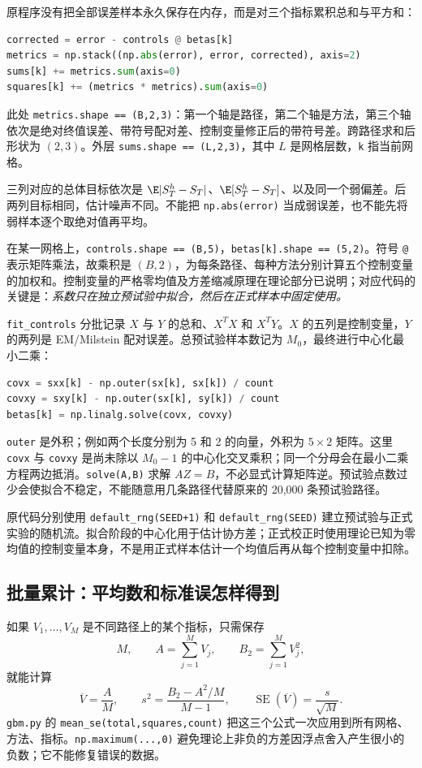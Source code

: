 原程序没有把全部误差样本永久保存在内存，而是对三个指标累积总和与平方和：
\begin{lstlisting}[language=Python]
corrected = error - controls @ betas[k]
metrics = np.stack((np.abs(error), error, corrected), axis=2)
sums[k] += metrics.sum(axis=0)
squares[k] += (metrics * metrics).sum(axis=0)
\end{lstlisting}
此处 \texttt{metrics.shape == (B,2,3)}：第一个轴是路径，第二个轴是方法，第三个轴依次是绝对终值误差、带符号配对差、控制变量修正后的带符号差。跨路径求和后形状为 $(2,3)$。外层 \texttt{sums.shape == (L,2,3)}，其中 $L$ 是网格层数，\texttt{k} 指当前网格。

三列对应的总体目标依次是 $\E|S_T^h-S_T|$、$\E[S_T^h-S_T]$、以及同一个弱偏差。后两列目标相同，估计噪声不同。不能把 \texttt{np.abs(error)} 当成弱误差，也不能先将弱样本逐个取绝对值再平均。

在某一网格上，\texttt{controls.shape == (B,5)}，\texttt{betas[k].shape == (5,2)}。符号 \texttt{@} 表示矩阵乘法，故乘积是 $(B,2)$，为每条路径、每种方法分别计算五个控制变量的加权和。控制变量的严格零均值及方差缩减原理在理论部分已说明；对应代码的关键是：\emph{系数只在独立预试验中拟合，然后在正式样本中固定使用。}

\texttt{fit\_controls} 分批记录 $X$ 与 $Y$ 的总和、$X^TX$ 和 $X^TY$。$X$ 的五列是控制变量，$Y$ 的两列是 EM/Milstein 配对误差。总预试验样本数记为 $M_0$，最终进行中心化最小二乘：
\begin{lstlisting}[language=Python]
covx = sxx[k] - np.outer(sx[k], sx[k]) / count
covxy = sxy[k] - np.outer(sx[k], sy[k]) / count
betas[k] = np.linalg.solve(covx, covxy)
\end{lstlisting}
\texttt{outer} 是外积；例如两个长度分别为 5 和 2 的向量，外积为 $5\times2$ 矩阵。这里 \texttt{covx} 与 \texttt{covxy} 是尚未除以 $M_0-1$ 的中心化交叉乘积；同一个分母会在最小二乘方程两边抵消。\texttt{solve(A,B)} 求解 $AZ=B$，不必显式计算矩阵逆。预试验点数过少会使拟合不稳定，不能随意用几条路径代替原来的 20,000 条预试验路径。

原代码分别使用 \texttt{default\_rng(SEED+1)} 和 \texttt{default\_rng(SEED)} 建立预试验与正式实验的随机流。拟合阶段的中心化用于估计协方差；正式校正时使用理论已知为零均值的控制变量本身，不是用正式样本估计一个均值后再从每个控制变量中扣除。

\subsection{批量累计：平均数和标准误怎样得到}

如果 $V_1,\ldots,V_M$ 是不同路径上的某个指标，只需保存
\[
M,\qquad A=\sum_{j=1}^M V_j,\qquad B_2=\sum_{j=1}^M V_j^2,
\]
就能计算
\begin{equation}
\overline V=\frac{A}{M},\qquad
s^2=\frac{B_2-A^2/M}{M-1},\qquad
\operatorname{SE}(\overline V)=\frac{s}{\sqrt M}.
\label{code:streaming}
\end{equation}
\texttt{gbm.py} 的 \texttt{mean\_se(total,squares,count)} 把这三个公式一次应用到所有网格、方法、指标。\texttt{np.maximum(...,0)} 避免理论上非负的方差因浮点舍入产生很小的负数；它不能修复错误的数据。

